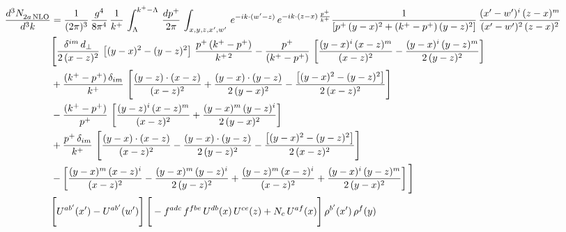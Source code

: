\documentclass[9pt]{article}
\numberwithin{equation}{section}
\begin{document}
\begin{align}
    \frac{d^{3}N_{2a\,\rm NLO}^{\rm}}{d^{3}k}  & =  \frac{1}{(2\pi)^{3}}\,\frac{g^{4}}{8\pi^{4}}\,\frac{1}{k^{+}}\,\int_{\Lambda}^{k^{+}-\Lambda}\, \frac{dp^{+}}{2\pi}\, \int_{x,y,z,x',w'}\,e^{-ik\cdot(w'-z)}\,e^{-ik\cdot (z-x)\,\frac{p^{+}}{k^{+}}}\frac{1}{\left[p^{+}\,(y-x)^{2}+(k^{+}-p^{+})\,(y-z)^{2}\right]}\, \frac{(x'-w')^{i}\,(z-x)^{m}}{(x'-w')^{2}\,(z-x)^{2}} \notag \\ & \Bigg[\frac{\delta^{im}\,d_{\perp}}{2\,(x-z)^{2}}\,\left[(y-x)^{2}-(y-z)^{2}\right]\,\frac{p^{+}\,(k^{+}-p^{+})}{k^{+\,2}}-\frac{p^{+}}{(k^{+}-p^{+})}\,\left[\frac{(y-x)^{i}\,(x-z)^{m}}{(x-z)^{2}}-\frac{(y-x)^{i}\,(y-z)^{m}}{2\,(y-z)^{2}}\right]\notag \\ & +\frac{(k^{+}-p^{+})\,\delta_{im}}{k^{+}}\,\left[\frac{(y-z)\cdot (x-z)}{(x-z)^{2}}+\frac{(y-x)\cdot (y-z)}{2\,(y-x)^{2}}-\frac{\left[(y-x)^{2}-(y-z)^{2}\right]}{2\,(x-z)^{2}}\right]\notag \\ & -\frac{(k^{+}-p^{+})}{p^{+}}\,\left[\frac{(y-z)^{i}\,(x-z)^{m}}{(x-z)^{2}}+\frac{(y-x)^{m}\,(y-z)^{i}}{2\,(y-x)^{2}}\right]\notag \\ & +\frac{p^{+}\,\delta_{im}}{k^{+}}\,\left[\frac{(y-x)\cdot (x-z)}{(x-z)^{2}}-\frac{(y-x)\cdot (y-z)}{2\,(y-z)^{2}}-\frac{\left[(y-x)^{2}-(y-z)^{2}\right]}{2\,(x-z)^{2}}\right]\notag \\ &-\left[\frac{(y-x)^{m}\,(x-z)^{i}}{(x-z)^{2}}-\frac{(y-x)^{m}\,(y-z)^{i}}{2\,(y-z)^{2}}+\frac{(y-z)^{m}\,(x-z)^{i}}{(x-z)^{2}}+\frac{(y-x)^{i}\,(y-z)^{m}}{2\,(y-x)^{2}}\right]\Bigg] \notag \\ & \Bigg[U^{ab'}(x')-U^{ab'}(w')\Bigg]\,\Bigg[-f^{adc}\,f^{fbe}\,U^{db}(x)\,U^{ce}(z)+N_{c}\,U^{af}(x)\Bigg]\,\rho^{b'}(x')\,\rho^{f}(y)
\end{align}
\end{document}
